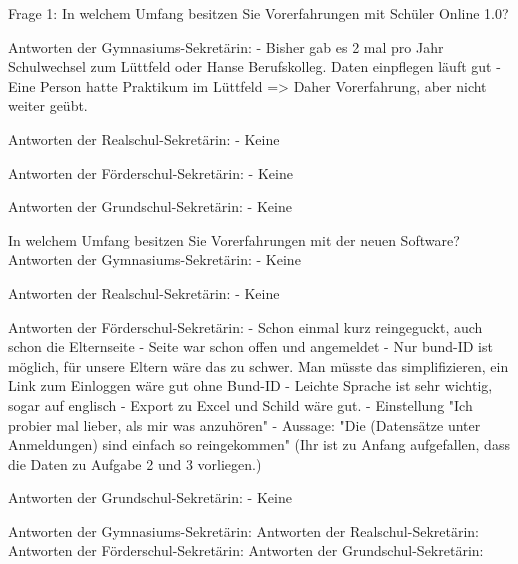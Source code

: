 Frage 1: In welchem Umfang besitzen Sie Vorerfahrungen mit Schüler Online 1.0? 	

Antworten der Gymnasiums-Sekretärin:
- Bisher gab es 2 mal pro Jahr Schulwechsel zum Lüttfeld oder Hanse Berufskolleg. Daten einpflegen läuft gut
- Eine Person hatte Praktikum im Lüttfeld => Daher Vorerfahrung, aber nicht weiter geübt.

Antworten der Realschul-Sekretärin:
- Keine	

Antworten der Förderschul-Sekretärin:
- Keine

Antworten der Grundschul-Sekretärin:
- Keine


In welchem Umfang besitzen Sie Vorerfahrungen mit der neuen Software?		
Antworten der Gymnasiums-Sekretärin:
- Keine				

Antworten der Realschul-Sekretärin:
- Keine				

Antworten der Förderschul-Sekretärin:
- Schon einmal kurz reingeguckt, auch schon die Elternseite
- Seite war schon offen und angemeldet	
- Nur bund-ID ist möglich, für unsere Eltern wäre das zu schwer. Man müsste das simplifizieren, ein Link zum Einloggen wäre gut ohne Bund-ID
- Leichte Sprache ist sehr wichtig, sogar auf englisch
- Export zu Excel und Schild wäre gut.
- Einstellung "Ich probier mal lieber, als mir was anzuhören"
- Aussage: "Die (Datensätze unter Anmeldungen) sind einfach so reingekommen" (Ihr ist zu Anfang aufgefallen, dass die Daten zu Aufgabe 2 und 3 vorliegen.)			

Antworten der Grundschul-Sekretärin:
- Keine				







Antworten der Gymnasiums-Sekretärin:
Antworten der Realschul-Sekretärin:
Antworten der Förderschul-Sekretärin:
Antworten der Grundschul-Sekretärin: